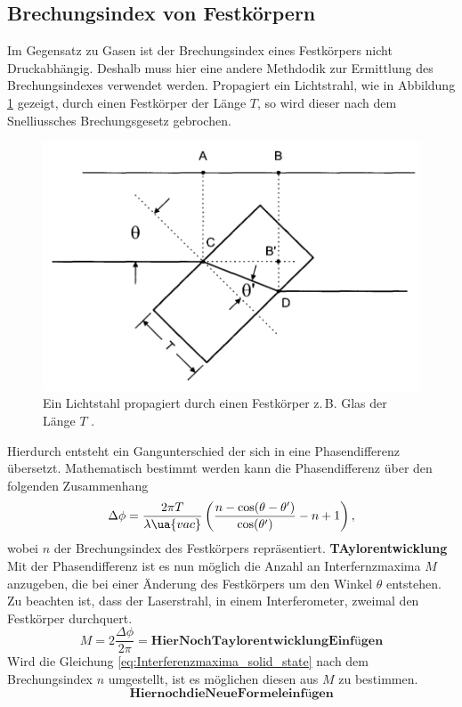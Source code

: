 \subsection{Brechungsindex von Festkörpern}
Im Gegensatz zu Gasen ist der Brechungsindex eines Festkörpers nicht Druckabhängig.
Deshalb muss hier eine andere Methdodik zur Ermittlung des Brechungsindexes verwendet werden.
Propagiert ein Lichtstrahl, wie in Abbildung \ref{fig:slag} gezeigt, durch einen Festkörper der Länge $T$,
so wird dieser nach dem Snelliussches Brechungsgesetz gebrochen.
\begin{figure}
\centering
\includegraphics[width=0.6\linewidth]{./content/images/slab.png}
\caption{Ein Lichtstahl propagiert durch einen Festkörper z.\,B. Glas der Länge $T$ \cite{anleitung64}.}
\label{fig:slag}
\end{figure}
Hierdurch entsteht ein Gangunterschied der sich in eine Phasendifferenz übersetzt.
Mathematisch bestimmt werden kann die Phasendifferenz über den folgenden Zusammenhang
\begin{equation}
  \label{eq:Phasendifferenz_festkörper}
  \Delta\phi=\frac{ 2\pi T }{ \lambda\ua{vac} }\left( \frac{ n-\cos(\theta-\theta') }{ \cos(\theta') } - n+1\right),
\end{equation}
wobei $n$ der Brechungsindex des Festkörpers repräsentiert.
\textbf{TAylorentwicklung}
Mit der Phasendifferenz ist es nun möglich die Anzahl an Interfernzmaxima $M$ anzugeben, die bei einer Änderung
des Festkörpers um den Winkel $\theta$ entstehen. Zu beachten ist, dass der Laserstrahl, in einem Interferometer, zweimal den Festkörper durchquert.
\begin{equation}
  \label{eq:Interferenzmaxima_solid_state}
  M=2\frac{\Delta\phi}{2\pi}=\textbf{HierNochTaylorentwicklungEinfügen}
\end{equation}
Wird die Gleichung \eqref{eq:Interferenzmaxima_solid_state} nach dem Brechungsindex $n$
umgestellt, ist es möglichen diesen aus $M$ zu bestimmen.
\begin{equation}
  \textbf{HiernochdieNeueFormeleinfügen}
\end{equation}

